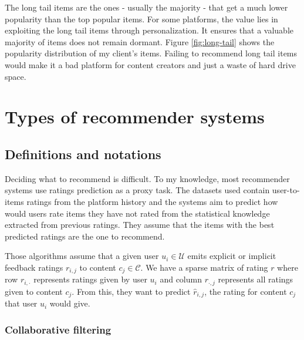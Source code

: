 The long tail items are the ones - usually the majority - that get a much lower popularity than the top popular items. For some platforms, the value lies in exploiting the long tail items through personalization. It ensures that a valuable majority of items does not remain dormant. Figure \ref{fig:long-tail} shows the popularity distribution of my client's items. Failing to recommend long tail items would make it a bad platform for content creators and just a waste of hard drive space.

\section{Types of recommender systems}

\subsection{Definitions and notations}

Deciding what to recommend is difficult. To my knowledge, most recommender systems use ratings prediction as a proxy task. The datasets used contain user-to-items ratings from the platform history and the systems aim to predict how would users rate items they have not rated from the statistical knowledge extracted from previous ratings. They assume that the items with the best predicted ratings are the one to recommend.

Those algorithms assume that a given user $u_i \in \mathcal{U}$ emits explicit or implicit feedback ratings $r_{i,j}$ to content $c_j \in \mathcal{C}$. We have a sparse matrix of rating $r$ where row $r_{i,\cdot }$ represents ratings given by user $u_i$ and column $r_{\cdot,j}$ represents all ratings given to content $c_j$. From this, they want to predict $\hat{r}_{i,j}$, the rating for content $c_j$ that user $u_i$ would give.

\subsubsection{Collaborative filtering}

